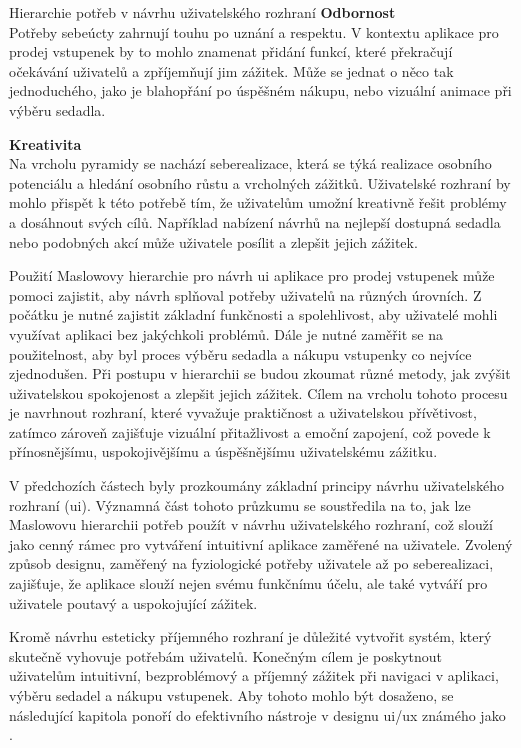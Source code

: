 \begin{subsection}{Hierarchie potřeb v návrhu uživatelského rozhraní}
    \textbf{Odbornost}\\
    Potřeby sebeúcty zahrnují touhu po uznání a respektu.
    V kontextu aplikace pro prodej vstupenek by to mohlo znamenat přidání funkcí, které překračují očekávání uživatelů a zpříjemňují jim zážitek.
    Může se jednat o něco tak jednoduchého, jako je blahopřání po úspěšném nákupu, nebo vizuální animace při výběru sedadla.

    \textbf{Kreativita}\\
    Na vrcholu pyramidy se nachází seberealizace, která se týká realizace osobního potenciálu a hledání osobního růstu a vrcholných zážitků.
    Uživatelské rozhraní by mohlo přispět k této potřebě tím, že uživatelům umožní kreativně řešit problémy a dosáhnout svých cílů.
    Například nabízení návrhů na nejlepší dostupná sedadla nebo podobných akcí může uživatele posílit a zlepšit jejich zážitek.

    Použití Maslowovy hierarchie pro návrh \ac{ui} aplikace pro prodej vstupenek může pomoci zajistit, aby návrh splňoval potřeby uživatelů na různých úrovních.
    Z počátku je nutné zajistit základní funkčnosti a spolehlivost, aby uživatelé mohli využívat aplikaci bez jakýchkoli problémů.
    Dále je nutné zaměřit se na použitelnost, aby byl proces výběru sedadla a nákupu vstupenky co nejvíce zjednodušen.
    Při postupu v hierarchii se budou zkoumat různé metody, jak zvýšit uživatelskou spokojenost a zlepšit jejich zážitek.
    Cílem na vrcholu tohoto procesu je navrhnout rozhraní, které vyvažuje praktičnost a uživatelskou přívětivost, zatímco zároveň zajišťuje vizuální přitažlivost a emoční zapojení, což povede k přínosnějšímu, uspokojivějšímu a úspěšnějšímu uživatelskému zážitku.

    V předchozích částech byly prozkoumány základní principy návrhu uživatelského rozhraní (\ac{ui}).
    Významná část tohoto průzkumu se soustředila na to, jak lze Maslowovu hierarchii potřeb použít v návrhu uživatelského rozhraní, což slouží jako cenný rámec pro vytváření intuitivní aplikace zaměřené na uživatele.
    Zvolený způsob designu, zaměřený na fyziologické potřeby uživatele až po seberealizaci, zajišťuje, že aplikace slouží nejen svému funkčnímu účelu, ale také vytváří pro uživatele poutavý a uspokojující zážitek.

    Kromě návrhu esteticky příjemného rozhraní je důležité vytvořit systém, který skutečně vyhovuje potřebám uživatelů.
    Konečným cílem je poskytnout uživatelům intuitivní, bezproblémový a příjemný zážitek při navigaci v aplikaci, výběru sedadel a nákupu vstupenek.
    Aby tohoto mohlo být dosaženo, se následující kapitola ponoří do efektivního nástroje v designu \ac{ui}/\ac{ux} známého jako .
\end{subsection}
